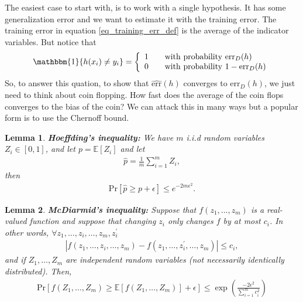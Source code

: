\documentclass[10pt ]{article}
\newtheorem{lem}{Lemma}
\begin{document}
The easiest case to start with, is to work with a single hypothesis. It has some generalization error and we want to estimate it with the training error. The training error in equation \eqref{eq_training_err_def} is the average of the indicator variables. But notice that 
\begin{align}
 \mathbbm{1}\{h(x_i) \neq y_i\} = \left\{
                \begin{array}{ll}
                1 \qquad \mathrm{with ~probability~} \mathrm{err}_D (h) \\
                  0 \qquad \mathrm{with ~probability~} 1- \mathrm{err}_D (h)
                \end{array}
              \right.
\end{align}
So, to answer this quation, to show that $ \widehat{\mathrm{err}}(h)$ converges to $ \mathrm{err}_D (h)$, we just need to think about coin flopping. How fast does the average of the coin flops converges to the bias of the coin? We can attack this in many ways but a popular form is to use the Chernoff bound. 

\begin{lem}
{\em 
\textbf{Hoeffding's inequality:} We have $m$ i.i.d random variables $Z_i \in [0,1]$,  and let $p = \mathbb{E}[Z_i]$ and let
\begin{align}
\hat{p} = \frac{1}{m} \sum_{i=1}^m Z_i,
\end{align}
then 
\begin{align}
\mathrm{Pr} [\hat{p} \ge p + \epsilon]  \le e^{-2m\epsilon^2}.
\end{align}
}
\end{lem}

\begin{lem}
{\em 
\textbf{McDiarmid's inequality:} Suppose that $f(z_1,\dots,z_m)$ is a real-valued function and suppose that changing $z_i$ only changes $f$ by at most $c_i$. In other words, $\forall z_1,\dots,z_i,\dots,z_m, z_i^{\prime}$
\begin{align}
|f(z_1,\dots,z_i,\dots,z_m) - f(z_1,\dots,z_i^{\prime},\dots,z_m)| \le c_i, 
\end{align}
and if $Z_1,\dots,Z_m$ are independent random variables (not necessarily identically distributed). Then, 
\begin{align}
\mathrm{Pr} \left[ f(Z_1,\dots,Z_m) \ge \mathbb{E}[f(Z_1,\dots,Z_m)]  +\epsilon \right] \le \exp \left( \frac{-2 \epsilon^2}{\sum_{i=1}^m c_i^2}\right)
\end{align}
}\end{lem}
\end{document}
